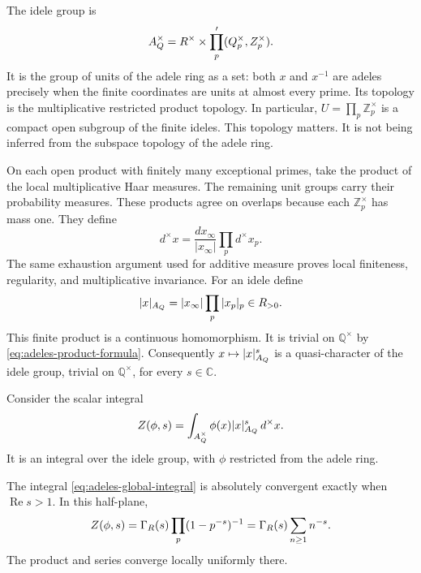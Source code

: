 The idele group is
\[
 A_{Q}^\times=R^\times\times\prod_p'(Q_p^\times,Z_p^\times).
\]
It is the group of units of the adele ring as a set: both \(x\) and
\(x^{-1}\) are adeles precisely when the finite coordinates are units
at almost every prime. Its topology is the multiplicative restricted
product topology. In particular,
\(U=\prod_p\mathbb Z_p^\times\) is a compact open subgroup of the finite ideles.
This topology matters. It is not being inferred from the subspace topology
of the adele ring.

On each open product with finitely many exceptional primes, take the
product of the local multiplicative Haar measures. The remaining unit
groups carry their probability measures. These products agree on overlaps
because each \(\mathbb Z_p^\times\) has mass one. They define
\[
 d^{\times} x=\frac{dx_\infty}{|x_\infty|}\prod_pd^{\times} x_p.
\]
The same exhaustion argument used for additive measure proves local
finiteness, regularity, and multiplicative invariance.
For an idele define
\[
 |x|_{A_{Q}}=|x_\infty|\prod_p|x_p|_p\in R_{>0}.
\]
This finite product is a continuous homomorphism. It is trivial on
\(\mathbb Q^\times\) by \eqref{eq:adeles-product-formula}.
Consequently \(x\mapsto|x|_{A_{Q}}^s\) is a quasi-character of the idele
group, trivial on \(\mathbb Q^\times\), for every \(s\in\mathbb C\).

Consider the scalar integral
\begin{equation}
 Z(\phi,s)=\int_{A_{Q}^\times}\phi(x)|x|_{A_{Q}}^s\,d^{\times} x.
 \label{eq:adeles-global-integral}
\end{equation}
It is an integral over the idele group, with \(\phi\) restricted from
the adele ring.

\begin{proposition}
\label{prop:adeles-euler-product}
The integral \eqref{eq:adeles-global-integral} is absolutely convergent
exactly when \(\operatorname{Re}s>1\). In this half-plane,
\begin{equation}
 Z(\phi,s)=\Gamma_{R}(s)\prod_p(1-p^{-s})^{-1}
 =\Gamma_{R}(s)\sum_{n\geq1}n^{-s}.
 \label{eq:adeles-euler}
\end{equation}
The product and series converge locally uniformly there.
\end{proposition}

